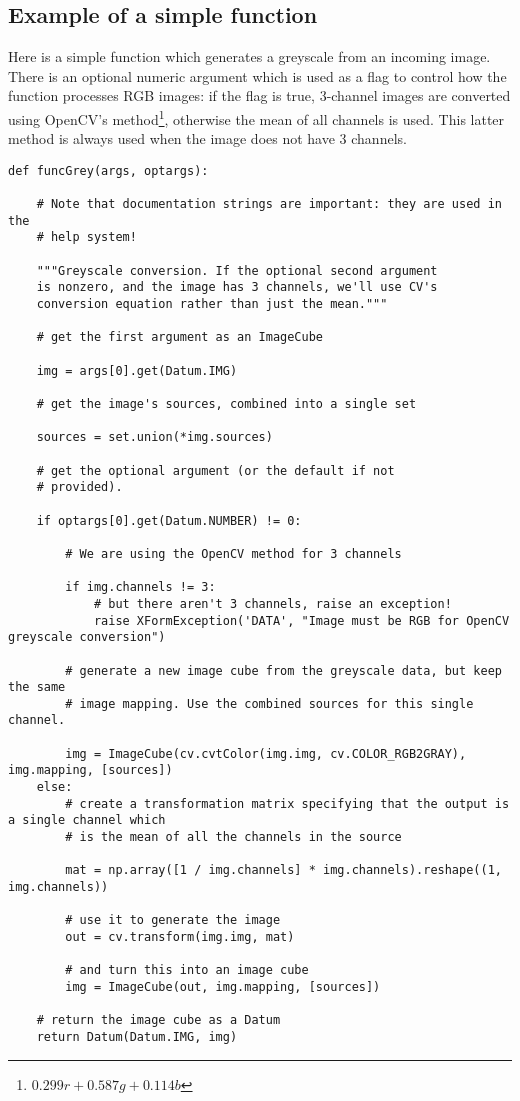 \subsection{Example of a simple function}
Here is a simple function which generates a greyscale from an incoming image. There is an optional
numeric argument which is used as a flag to control how the function processes RGB images:
if the flag is true, 3-channel images are converted using OpenCV's
method\footnote{$0.299r + 0.587g + 0.114b$},
otherwise the mean of all channels is used. This latter method is always used when the image does not have
3 channels.

\begin{lstlisting}
def funcGrey(args, optargs):

    # Note that documentation strings are important: they are used in the
    # help system!
    
    """Greyscale conversion. If the optional second argument
    is nonzero, and the image has 3 channels, we'll use CV's
    conversion equation rather than just the mean."""

    # get the first argument as an ImageCube
    
    img = args[0].get(Datum.IMG)
    
    # get the image's sources, combined into a single set
    
    sources = set.union(*img.sources)

    # get the optional argument (or the default if not
    # provided).
    
    if optargs[0].get(Datum.NUMBER) != 0:

        # We are using the OpenCV method for 3 channels
        
        if img.channels != 3:
            # but there aren't 3 channels, raise an exception!
            raise XFormException('DATA', "Image must be RGB for OpenCV greyscale conversion")

        # generate a new image cube from the greyscale data, but keep the same
        # image mapping. Use the combined sources for this single channel.

        img = ImageCube(cv.cvtColor(img.img, cv.COLOR_RGB2GRAY), img.mapping, [sources])
    else:
        # create a transformation matrix specifying that the output is a single channel which
        # is the mean of all the channels in the source
        
        mat = np.array([1 / img.channels] * img.channels).reshape((1, img.channels))

        # use it to generate the image
        out = cv.transform(img.img, mat)

        # and turn this into an image cube
        img = ImageCube(out, img.mapping, [sources])
    
    # return the image cube as a Datum
    return Datum(Datum.IMG, img)
\end{lstlisting}

